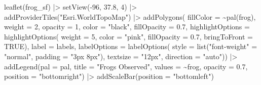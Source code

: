 \documentclass[
  letterpaper,
  DIV=11,
  numbers=noendperiod]{scrartcl}
\newenvironment{Shaded}{\begin{snugshade}}{\end{snugshade}}
\newcommand{\AttributeTok}[1]{\textcolor[rgb]{0.40,0.45,0.13}{#1}}
\newcommand{\ConstantTok}[1]{\textcolor[rgb]{0.56,0.35,0.01}{#1}}
\newcommand{\DecValTok}[1]{\textcolor[rgb]{0.68,0.00,0.00}{#1}}
\newcommand{\FloatTok}[1]{\textcolor[rgb]{0.68,0.00,0.00}{#1}}
\newcommand{\FunctionTok}[1]{\textcolor[rgb]{0.28,0.35,0.67}{#1}}
\newcommand{\NormalTok}[1]{\textcolor[rgb]{0.00,0.23,0.31}{#1}}
\newcommand{\OtherTok}[1]{\textcolor[rgb]{0.00,0.23,0.31}{#1}}
\newcommand{\SpecialCharTok}[1]{\textcolor[rgb]{0.37,0.37,0.37}{#1}}
\newcommand{\StringTok}[1]{\textcolor[rgb]{0.13,0.47,0.30}{#1}}
\begin{document}
\begin{Shaded}
\begin{Highlighting}[]
\FunctionTok{leaflet}\NormalTok{(frog\_sf) }\SpecialCharTok{|\textgreater{}}
  \FunctionTok{setView}\NormalTok{(}\SpecialCharTok{{-}}\DecValTok{96}\NormalTok{, }\FloatTok{37.8}\NormalTok{, }\DecValTok{4}\NormalTok{) }\SpecialCharTok{|\textgreater{}}
  \FunctionTok{addProviderTiles}\NormalTok{(}\StringTok{"Esri.WorldTopoMap"}\NormalTok{) }\SpecialCharTok{|\textgreater{}}
  \FunctionTok{addPolygons}\NormalTok{(}
    \AttributeTok{fillColor =} \SpecialCharTok{\textasciitilde{}}\FunctionTok{pal}\NormalTok{(frog),}
    \AttributeTok{weight =} \DecValTok{2}\NormalTok{,}
    \AttributeTok{opacity =} \DecValTok{1}\NormalTok{,}
    \AttributeTok{color =} \StringTok{"black"}\NormalTok{,}
    \AttributeTok{fillOpacity =} \FloatTok{0.7}\NormalTok{,}
    \AttributeTok{highlightOptions =} \FunctionTok{highlightOptions}\NormalTok{(}
      \AttributeTok{weight =} \DecValTok{5}\NormalTok{,}
      \AttributeTok{color =} \StringTok{"pink"}\NormalTok{,}
      \AttributeTok{fillOpacity =} \FloatTok{0.7}\NormalTok{,}
      \AttributeTok{bringToFront =} \ConstantTok{TRUE}\NormalTok{),}
    \AttributeTok{label =}\NormalTok{ labels,}
    \AttributeTok{labelOptions =} \FunctionTok{labelOptions}\NormalTok{(}
      \AttributeTok{style =} \FunctionTok{list}\NormalTok{(}\StringTok{"font{-}weight"} \OtherTok{=} \StringTok{"normal"}\NormalTok{, }\AttributeTok{padding =} \StringTok{"3px 8px"}\NormalTok{),}
      \AttributeTok{textsize =} \StringTok{"12px"}\NormalTok{,}
      \AttributeTok{direction =} \StringTok{"auto"}\NormalTok{)) }\SpecialCharTok{|\textgreater{}}
  \FunctionTok{addLegend}\NormalTok{(}\AttributeTok{pal =}\NormalTok{ pal, }\AttributeTok{title =} \StringTok{"Frogs Observed"}\NormalTok{, }\AttributeTok{values =} \SpecialCharTok{\textasciitilde{}}\NormalTok{frog, }\AttributeTok{opacity =} \FloatTok{0.7}\NormalTok{, }\AttributeTok{position =} \StringTok{"bottomright"}\NormalTok{) }\SpecialCharTok{|\textgreater{}}
  \FunctionTok{addScaleBar}\NormalTok{(}\AttributeTok{position =} \StringTok{"bottomleft"}\NormalTok{)}
\end{Highlighting}
\end{Shaded}
\end{document}
